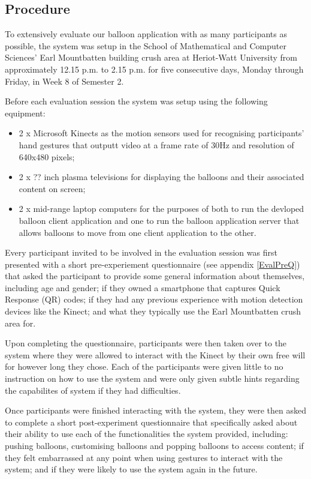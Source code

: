 \subsection{Procedure}

To extensively evaluate our balloon application with as many participants as possible, the system was setup in the School of Mathematical and Computer Sciences'  Earl Mountbatten building crush area at Heriot-Watt University from approximately 12.15 p.m. to 2.15 p.m. for five consecutive days, Monday through Friday, in Week 8 of Semester 2.

Before each evaluation session the system was setup using the following equipment:
\begin{itemize}
\item{2 x Microsoft Kinects as the motion sensors used for recognising participants' hand gestures that outputt video at a frame rate of 30Hz and resolution of 640x480 pixels;}
\item{2 x ?? inch plasma televisions for displaying the balloons and their associated content on screen; }
\item{2 x mid-range laptop computers for the purposes of both to run the devloped balloon client application and one to run the balloon application server that allows balloons to move from one client application to the other.}
\end{itemize}

Every participant invited to be involved in the evaluation session was first presented with a short pre-experiement questionnaire (see appendix \vref{EvalPreQ}) that asked the participant to provide some general information about themselves, including age and gender; if they owned a smartphone that captures Quick Response (QR) codes; if they had any previous experience with motion detection devices like the Kinect; and what they typically use the Earl Mountbatten crush area for.

Upon completing the questionnaire, participants were then taken over to the system where they were allowed to interact with the Kinect by their own free will for however long they chose. Each of the participants were given little to no instruction on how to use the system and were only given subtle hints regarding the capabilites of system if they had difficulties.

Once participants were finished interacting with the system, they were then asked to complete a short post-experiment questionnaire that specifically asked about their ability to use each of the functionalities the system provided, including: pushing balloons, customising balloons and popping balloons to access content; if they felt embarrassed at any point when using gestures to interact with the system; and if they were likely to use the system again in the future.

